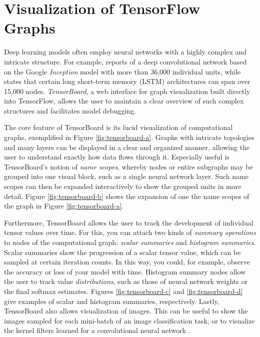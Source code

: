 \section{Visualization of TensorFlow Graphs}\label{sec:visual}

Deep learning models often employ neural networks with a highly complex and
intricate structure. For example, \cite{inception} reports of a deep
convolutional network based on the Google \emph{Inception} model with more than
36,000 individual units, while \cite{tensorflow} states that certain long
short-term memory (LSTM) architectures can span over 15,000
nodes. \emph{TensorBoard}, a web interface for graph visualization built
directly into TensorFlow, allows the user to maintain a clear overview of such
complex structures and facilitates model debugging.

The core feature of TensorBoard is its lucid visualization of computational
graphs, exemplified in Figure \ref{fig:tensorboard-a}. Graphs with intricate
topologies and many layers can be displayed in a clear and organized manner,
allowing the user to understand exactly how data flows through it. Especially
useful is TensorBoard's notion of \emph{name scopes}, whereby nodes or entire
subgraphs may be grouped into one visual block, such as a single neural network
layer. Such name scopes can then be expanded interactively to show the grouped
units in more detail. Figure \ref{fig:tensorboard-b} shows the expansion of one
the name scopes of the graph in Figure \ref{fig:tensorboard-a}.

Furthermore, TensorBoard allows the user to track the development of individual
tensor values over time. For this, you can attach two kinds of \emph{summary
  operations} to nodes of the computational graph: \emph{scalar summaries} and
\emph{histogram summaries}. Scalar summaries show the progression of a scalar
tensor value, which can be sampled at certain iteration counts. In this way, you
could, for example, observe the accuracy or loss of your model with
time. Histogram summary nodes allow the user to track value
\emph{distributions}, such as those of neural network weights or the final
softmax estimates. Figures \ref{fig:tensorboard-c} and \ref{fig:tensorboard-d}
give examples of scalar and histogram summaries, respectively. Lastly,
TensorBoard also allows visualization of images. This can be useful to show the
images sampled for each mini-batch of an image classification task, or to
visualize the kernel filters learned for a convolutional neural network
\cite{tensorflow}.

